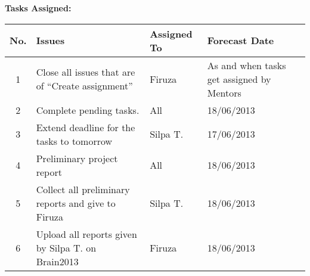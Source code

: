 \documentclass[a4paper,12pt]{article}
\begin{document}
\pagebreak

\vskip20pt

\textbf{Tasks Assigned:}
\vskip10pt
\begin{tabular}{|c|p{6cm}|p{3cm}|p{4cm}|}
 \hline
 \hline
 \textbf{No.} & \textbf{Issues} & \textbf{Assigned To} & \textbf{Forecast Date} \\
  \hline
  \hline
1 & Close all issues that are of ``Create assignment'' & Firuza & As and when tasks get assigned by Mentors \\
  \hline
2 & Complete pending tasks. & All & 18/06/2013 \\
  \hline
3 & Extend deadline for the tasks to tomorrow & Silpa T. & 17/06/2013 \\
  \hline
4 & Preliminary project report & All & 18/06/2013 \\
  \hline
5 & Collect all preliminary reports and give to Firuza & Silpa T. & 18/06/2013 \\
  \hline
6 & Upload all reports given by Silpa T. on Brain2013 & Firuza & 18/06/2013 \\
  \hline
\end{tabular}
\end{document}
